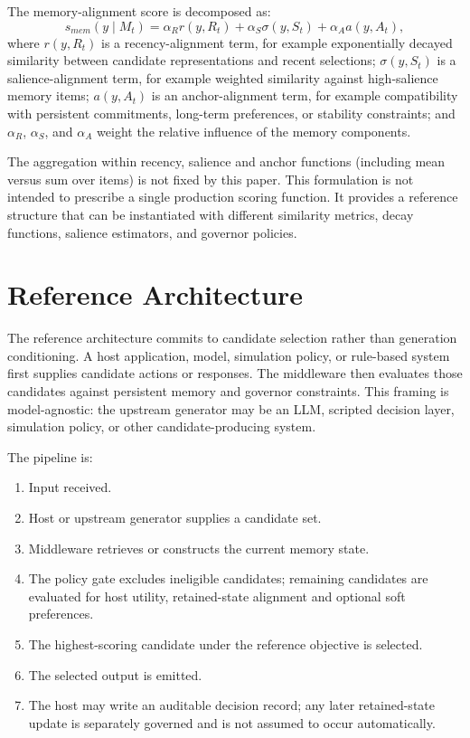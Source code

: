 \documentclass[11pt]{article}
\begin{document}
The memory-alignment score is decomposed as:
\begin{equation}
s_{mem}(y \mid M_t)
=
\alpha_R r(y,R_t)
+
\alpha_S \sigma(y,S_t)
+
\alpha_A a(y,A_t),
\label{eq:memory}
\end{equation}
where $r(y,R_t)$ is a recency-alignment term, for example exponentially decayed similarity between candidate representations and recent selections; $\sigma(y,S_t)$ is a salience-alignment term, for example weighted similarity against high-salience memory items; $a(y,A_t)$ is an anchor-alignment term, for example compatibility with persistent commitments, long-term preferences, or stability constraints; and $\alpha_R$, $\alpha_S$, and $\alpha_A$ weight the relative influence of the memory components.

The aggregation within recency, salience and anchor functions (including mean versus sum over items) is not fixed by this paper. This formulation is not intended to prescribe a single production scoring function. It provides a reference structure that can be instantiated with different similarity metrics, decay functions, salience estimators, and governor policies.

\section{Reference Architecture}

The reference architecture commits to candidate selection rather than generation conditioning. A host application, model, simulation policy, or rule-based system first supplies candidate actions or responses. The middleware then evaluates those candidates against persistent memory and governor constraints. This framing is model-agnostic: the upstream generator may be an LLM, scripted decision layer, simulation policy, or other candidate-producing system.

The pipeline is:
\begin{enumerate}
    \item Input received.
    \item Host or upstream generator supplies a candidate set.
    \item Middleware retrieves or constructs the current memory state.
    \item The policy gate excludes ineligible candidates; remaining candidates are evaluated for host utility, retained-state alignment and optional soft preferences.
    \item The highest-scoring candidate under the reference objective is selected.
    \item The selected output is emitted.
    \item The host may write an auditable decision record; any later retained-state update is separately governed and is not assumed to occur automatically.
\end{enumerate}
\end{document}
